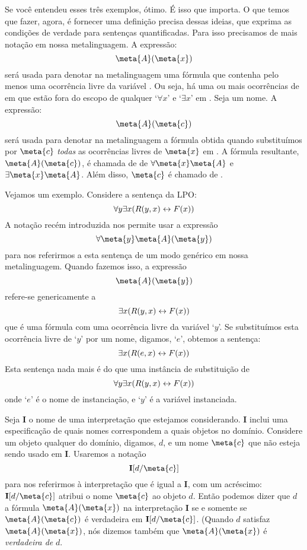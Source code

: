 Se você entendeu esses três exemplos, ótimo. É isso que importa.
O que temos que fazer, agora, é fornecer uma definição precisa dessas ideias, que exprima as condições de verdade para sentenças quantificadas.
Para isso precisamos de mais notação em nossa metalinguagem.
A expressão:
$$\meta{A}(\meta{x})$$
será usada para denotar na metalinguagem uma fórmula que contenha pelo menos uma ocorrência livre da variável .
Ou seja, há uma ou mais ocorrências de  em  que estão fora do escopo de qualquer `$\forall x$' e `$\exists x$' em .
Seja  um nome.
A expressão:
$$\meta{A}(\meta{c})$$
será usada para denotar na metalinguagem a fórmula obtida quando substituímos por $\meta{c}$ \emph{todas} as ocorrências livres de $\meta{x}$ em .
A fórmula resultante, $\meta{A}(\meta{c})$, é chamada de  de $\forall \meta{x} \meta{A}$ e $\exists \meta{x} \meta{A}$.
Além disso, $\meta{c}$ é chamado de .

Vejamos um exemplo.
Considere a sentença da LPO:
	$$\forall y \exists x (\mathord{R}(y,x) \leftrightarrow \mathord{F}(x))$$
A notação recém  introduzida nos permite usar a expressão
	$$\forall \meta{y} \atom{\meta{A}}{\meta{y}}$$
para nos referirmos a esta sentença de um modo genérico em nossa metalinguagem.
Quando fazemos isso, a expressão
	$$\atom{\meta{A}}{\meta{y}}$$
refere-se genericamente a
	$$\exists x (\mathord{R}(y,x) \leftrightarrow \mathord{F}(x))$$
que é uma fórmula com uma ocorrência livre da variável `$y$'.
Se substituímos esta ocorrência livre de `$y$' por um nome, digamos, `$e$', obtemos a sentença:
	$$\exists x (\mathord{R}(e,x) \leftrightarrow \mathord{F}(x))$$
Esta sentença nada mais é do que uma instância de substituição de 
	$$\forall y \exists x (\mathord{R}(y,x) \leftrightarrow \mathord{F}(x))$$
onde `$e$' é o nome de instanciação, e `$y$' é a variável instanciada.

Seja $\mathbf{I}$ o nome de uma interpretação que estejamos considerando.
$\mathbf{I}$ inclui uma especificação de quais nomes correspondem a quais objetos no domínio.
Considere um objeto  qualquer do domínio, digamos, $d$, e um nome $\meta{c}$ que não esteja sendo usado em $\mathbf{I}$.
Usaremos a notação
$$\mathbf{I}[d/\meta{c}]$$
para nos referirmos à interpretação que é igual a $\mathbf{I}$, com um acréscimo:
$\mathbf{I}[d/\meta{c}]$ atribui o nome $\meta{c}$ ao objeto $d$.
Então podemos dizer que $d$  a fórmula $\meta{A}(\meta{x})$ na interpretação $\mathbf{I}$ se e somente se $\meta{A}(\meta{c})$ é verdadeira em $\mathbf{I}[d/\meta{c}]$.
(Quando $d$ satisfaz $\meta{A}(\meta{x})$, nós dizemos também que $\meta{A}(\meta{x})$ é \emph{verdadeira de} $d$.

